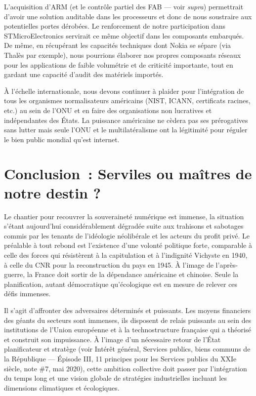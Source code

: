 \documentclass[a4paper]{article}
\begin{document}
L’acquisition d’ARM (et le contrôle partiel des FAB –-- voir \textit{supra}) permettrait d’avoir une solution auditable dans les processeurs et donc de nous soustraire aux potentielles portes dérobées. Le renforcement de notre participation dans STMicroElectronics servirait ce même objectif dans les composants embarqués. De même, en récupérant les capacités techniques dont Nokia se sépare (via Thalès par exemple), nous pourrions élaborer nos propres composants réseaux pour les applications de faible volumétrie et de criticité importante, tout en gardant une capacité d’audit des matériels importés. 

À l’échelle internationale, nous devons continuer à plaider pour l’intégration de tous les organismes normalisateurs américains (NIST, ICANN, certificats racines, etc.) au sein de l’ONU et en faire des organisations non lucratives et indépendantes des États. La puissance américaine ne cèdera pas ses prérogatives sans lutter mais seule l’ONU et le multilatéralisme ont la légitimité pour réguler le bien public mondial qu’est internet.

\section*{Conclusion~: Serviles ou maîtres de notre destin ?}
Le chantier pour recouvrer la souveraineté numérique est immense, la situation s'étant aujourd'hui considérablement dégradée suite aux trahisons et sabotages commis par les tenants de l'idéologie néolibérale et les acteurs du profit privé. Le préalable à tout rebond est l'existence d'une volonté politique forte, comparable à celle des forces qui résistèrent à la capitulation et à l'indignité Vichyste en 1940, à celle du CNR pour la reconstruction du pays en 1945. À l’image de l’après-guerre, la France doit sortir de la dépendance américaine et chinoise. Seule la planification, autant démocratique qu’écologique est en mesure de relever ces défis immenses.

Il s'agit d’affronter des adversaires déterminés et puissants. Les moyens financiers des géants du secteurs sont immenses, ils disposent de relais puissants au sein des institutions de l'Union européenne et à la technostructure française qui a théorisé et construit son impuissance. À l’image d'un nécessaire retour de l’État planificateur et stratège (voir Intérêt général, Services publics, biens communs de la République --- Épisode III, 11 principes pour les Services publics du XXIe siècle, note \#7, mai 2020), cette ambition collective doit passer par l'intégration du temps long et une vision globale de stratégies industrielles incluant les dimensions climatiques et écologiques. 
 
\end{document}
